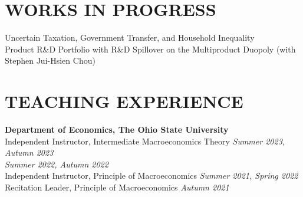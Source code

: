 \documentclass[10pt]{res} %
\begin{document}
\begin{resume}
\vspace{-10pt}

\section{WORKS IN PROGRESS}%
\label{sec:works_in_progress}
Uncertain Taxation, Government Transfer, and Household Inequality \\
Product R\&D Portfolio with R\&D Spillover on the Multiproduct Duopoly (with Stephen Jui-Hsien Chou) \\
\vspace{-10pt}

\section{TEACHING EXPERIENCE}%
\label{sec:teaching_experience}

\vspace{8pt} %

{\bf Department of Economics, The Ohio State University} \\
Independent Instructor, Intermediate Macroeconomics Theory \hfill \textit{Summer 2023, Autumn 2023} \\
\hspace*{\fill} \textit{Summer 2022, Autumn 2022} \\
Independent Instructor, Principle of Macroeconomics \hfill  \textit{Summer 2021, Spring 2022} \\
Recitation Leader, Principle of Macroeconomics \hfill  \textit{Autumn 2021}





\end{resume}
\end{document}
